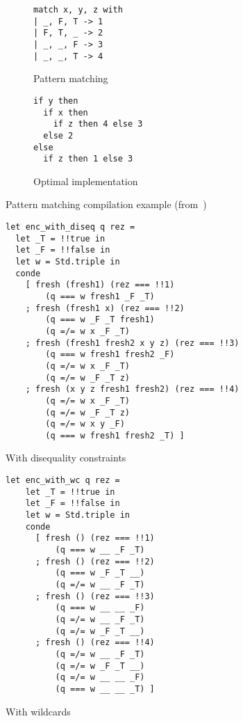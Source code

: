 \begin{figure}[t]
\begin{subfigure}[t]{0.4\linewidth}
\centering
\begin{lstlisting}
match x, y, z with
| _, F, T -> 1
| F, T, _ -> 2
| _, _, F -> 3
| _, _, T -> 4
\end{lstlisting}
\vskip4.5mm
\caption{Pattern matching}
\label{fig:matching-example1}
\end{subfigure}
\begin{subfigure}[t]{0.5\linewidth}
\centering
\begin{lstlisting}
if y then
  if x then
    if z then 4 else 3
  else 2
else
  if z then 1 else 3
\end{lstlisting}
\caption{Optimal implementation}
\label{fig:matching-example2}
\end{subfigure}
\caption{Pattern matching compilation example (from~\cite{maranget2001})} 
\label{fig:match-example}
\end{figure}

\begin{figure*}[t]
\begin{subfigure}{0.49\textwidth}
\begin{lstlisting}
let enc_with_diseq q rez =
  let _T = !!true in
  let _F = !!false in
  let w = Std.triple in 
  conde
    [ fresh (fresh1) (rez === !!1) 
        (q === w fresh1 _F _T)
    ; fresh (fresh1 x) (rez === !!2) 
        (q === w _F _T fresh1) 
        (q =/= w x _F _T)
    ; fresh (fresh1 fresh2 x y z) (rez === !!3) 
        (q === w fresh1 fresh2 _F) 
        (q =/= w x _F _T) 
        (q =/= w _F _T z)
    ; fresh (x y z fresh1 fresh2) (rez === !!4)
        (q =/= w x _F _T)
        (q =/= w _F _T z)
        (q =/= w x y _F)
        (q === w fresh1 fresh2 _T) ]
\end{lstlisting}
\caption{With disequality constraints}
\label{fig:matching-example3}
\end{subfigure}
\begin{subfigure}{0.49\textwidth}
\begin{lstlisting}
let enc_with_wc q rez =
    let _T = !!true in
    let _F = !!false in
    let w = Std.triple in
    conde
      [ fresh () (rez === !!1) 
          (q === w __ _F _T)
      ; fresh () (rez === !!2) 
          (q === w _F _T __) 
          (q =/= w __ _F _T)
      ; fresh () (rez === !!3) 
          (q === w __ __ _F) 
          (q =/= w __ _F _T) 
          (q =/= w _F _T __)
      ; fresh () (rez === !!4)
          (q =/= w __ _F _T)
          (q =/= w _F _T __)
          (q =/= w __ __ _F)
          (q === w __ __ _T) ]
\end{lstlisting}
\caption{With wildcards}
\end{subfigure}
\caption{Two possible encodings of an example from Fig.~\ref{fig:match-example}}
\label{fig:maranget-example-compilation}
\end{figure*}


